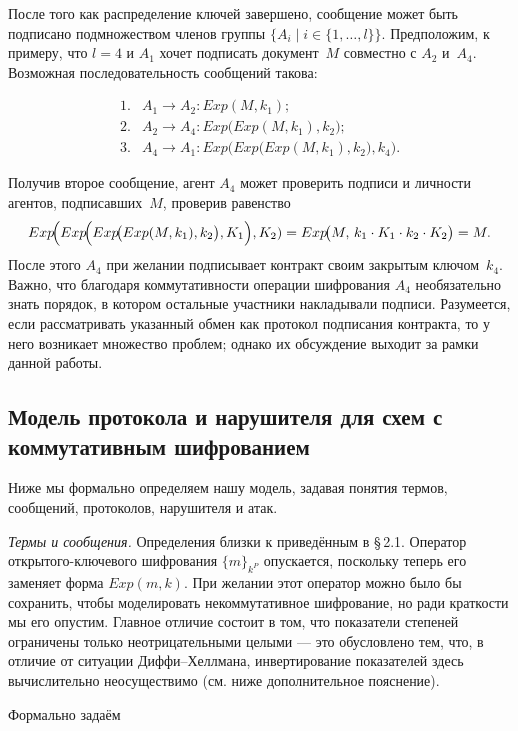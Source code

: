 После того как распределение ключей завершено, сообщение может быть
подписано подмножеством членов группы
$\{A_{i}\mid i\in\{1,\dots,l\}\}$.
Предположим, к примеру, что $l=4$ и $A_{1}$ хочет подписать
документ~$M$ совместно с $A_{2}$ и~$A_{4}$.
Возможная последовательность сообщений такова:  

\[
\begin{array}{ll}
1.& A_{1}\rightarrow A_{2}: Exp(M,k_{1});\\
2.& A_{2}\rightarrow A_{4}: Exp\!\bigl(Exp(M,k_{1}),k_{2}\bigr);\\
3.& A_{4}\rightarrow A_{1}: Exp\!\bigl(Exp\!\bigl(Exp(M,k_{1}),k_{2}\bigr),k_{4}\bigr).
\end{array}
\]

Получив второе сообщение, агент $A_{4}$ может проверить подписи и
личности агентов, подписавших~$M$, проверив равенство
\[
   Exp\!\Bigl(Exp\!\Bigl(Exp\!\bigl(Exp(M,k_{1}),k_{2}\bigr),K_{1}\Bigr),K_{2})
     = Exp\!\bigl(M,\,k_{1}\cdot K_{1}\cdot k_{2}\cdot K_{2}\bigr)
     = M.
\]
После этого $A_{4}$ при желании подписывает контракт своим закрытым
ключом~$k_{4}$. Важно, что благодаря коммутативности операции
шифрования $A_{4}$ необязательно знать порядок, в котором остальные
участники накладывали подписи.  
Разумеется, если рассматривать указанный обмен как протокол
подписания контракта, то у него возникает множество проблем;
однако их обсуждение выходит за рамки данной работы.

\subsection{Модель протокола и нарушителя для схем
             с коммутативным шифрованием}

Ниже мы формально определяем нашу модель, задавая понятия термов,
сообщений, протоколов, нарушителя и атак.

\textit{Термы и сообщения.} Определения близки к приведённым в
§\,2.1. Оператор открытого-ключевого шифрования \(\{m\}_{k^{P}}\) опускается,
поскольку теперь его заменяет форма \(Exp(m,k)\).
При желании этот оператор можно было бы сохранить, чтобы моделировать
некоммутативное шифрование, но ради краткости мы его опустим.
Главное отличие состоит в том, что показатели степеней ограничены
только неотрицательными целыми — это обусловлено тем, что,
в отличие от ситуации Диффи–Хеллмана, инвертирование показателей
здесь вычислительно неосуществимо
(см. ниже дополнительное пояснение).

Формально задаём

